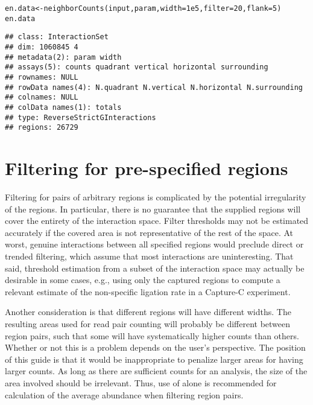 \documentclass{report}\usepackage[]{graphicx}\usepackage[usenames,dvipsnames]{color}
\newcommand{\hlnum}[1]{\textcolor[rgb]{0.816,0.125,0.439}{#1}}%
\newcommand{\hlstd}[1]{\textcolor[rgb]{0.251,0.251,0.251}{#1}}%
\newcommand{\hlkwb}[1]{\textcolor[rgb]{0,0,0}{#1}}%
\newcommand{\hlkwc}[1]{\textcolor[rgb]{0.251,0.251,0.251}{#1}}%
\newcommand{\hlkwd}[1]{\textcolor[rgb]{0.878,0.439,0.125}{#1}}%
\newenvironment{knitrout}{}{} %
\begin{document}
\begin{knitrout}
\color{fgcolor}\begin{kframe}
\begin{alltt}
\hlstd{en.data} \hlkwb{<-} \hlkwd{neighborCounts}\hlstd{(input, param,} \hlkwc{width}\hlstd{=}\hlnum{1e5}\hlstd{,} \hlkwc{filter}\hlstd{=}\hlnum{20}\hlstd{,} \hlkwc{flank}\hlstd{=}\hlnum{5}\hlstd{)}
\hlstd{en.data}
\end{alltt}
\begin{verbatim}
## class: InteractionSet 
## dim: 1060845 4 
## metadata(2): param width
## assays(5): counts quadrant vertical horizontal surrounding
## rownames: NULL
## rowData names(4): N.quadrant N.vertical N.horizontal N.surrounding
## colnames: NULL
## colData names(1): totals
## type: ReverseStrictGInteractions
## regions: 26729
\end{verbatim}
\end{kframe}
\end{knitrout}

\section{Filtering for pre-specified regions}
Filtering for pairs of arbitrary regions is complicated by the potential irregularity of the regions.
In particular, there is no guarantee that the supplied regions will cover the entirety of the interaction space.
Filter thresholds may not be estimated accurately if the covered area is not representative of the rest of the space.
At worst, genuine interactions between all specified regions would preclude direct or trended filtering, which assume that most interactions are uninteresting.
That said, threshold estimation from a subset of the interaction space may actually be desirable in some cases, e.g., using only the captured regions to compute a relevant estimate of the non-specific ligation rate in a Capture-C experiment.

Another consideration is that different regions will have different widths.
The resulting areas used for read pair counting will probably be different between region pairs, such that some will have systematically higher counts than others.
Whether or not this is a problem depends on the user's perspective.
The position of this guide is that it would be inappropriate to penalize larger areas for having larger counts. 
As long as there are sufficient counts for an analysis, the size of the area involved should be irrelevant.
Thus, use of  alone is recommended for calculation of the average abundance when filtering region pairs.
\end{document}
